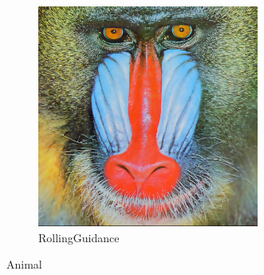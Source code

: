 \documentclass[12pt]{article}
\begin{document}
\begin{figure}
		\begin{subfigure}{0.4\textwidth}
			\centering
			\includegraphics[width=0.8\textwidth]{mandrill/mandrilltiffRollingGuidanceFilter.png}
			\caption{RollingGuidance}
		\end{subfigure}
		\caption{Animal}
	\end{figure}
	
\end{document}
